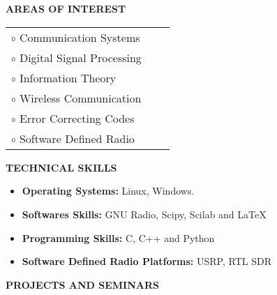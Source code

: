 \documentclass[a4paper,10pt]{article}
\begin{document}
{\qquad \\ \\ \\ \\ \\ \\ \\ \\ \\ \\ \\ \\}

\colorbox{titleColor}{\parbox{6.5in}{\textbf{AREAS OF INTEREST}}}

 \begin{tabular}{p{3.5in}p{5in}p{3.5in}}
    $\circ$ Communication Systems \\
    $\circ$ Digital Signal Processing \\
    $\circ$ Information Theory \\
    $\circ$ Wireless Communication \\
    $\circ$ Error Correcting Codes \\
    $\circ$ Software Defined Radio
  \end{tabular}

 \colorbox{titleColor}{\parbox{6.5in}{\textbf{TECHNICAL SKILLS}}}
 
 \begin{itemize}
 \setlength{\itemsep}{1pt}
 \item \textbf{{Operating Systems:}} Linux, Windows.
 \item \textbf{{Softwares Skills:}} GNU Radio, Scipy, Scilab and \LaTeX
 \item \textbf{{Programming Skills:}} C, C++ and Python
 \item \textbf{{Software Defined Radio Platforms:}} USRP, RTL SDR
 \end{itemize}

 \colorbox{titleColor}{\parbox{6.5in}{\textbf{PROJECTS AND SEMINARS}}}
\end{document}
